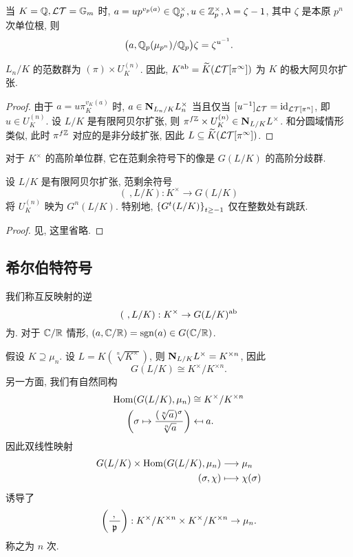 \begin{example}
当 $K={\mathbb{Q}},\mathcal{LT}=\mathbb{G}_m$ 时, $a=u p^{v_p(a)}\in {\mathbb{Q}}_p^\times,u\in{\mathbb{Z}}_p^\times,\lambda=\zeta-1$, 其中 $\zeta$ 是本原 $p^n$ 次单位根, 则
  \[\bigl(a,{\mathbb{Q}}_p(\mu_{p^n})/{\mathbb{Q}}_p\bigr)\zeta=\zeta^{u^{-1}}.\]
\end{example}

\begin{theorem}{}{}
$L_n/K$ 的范数群为 $(\pi)\times U_K^{(n)}$. 因此, $K^{\mathrm{ab}}=\widetilde K(\mathcal{LT}[\pi^\infty])$ 为 $K$ 的极大阿贝尔扩张.
\end{theorem}
\begin{proof}
由于 $a=u\pi_K^{v_K(a)}$ 时, $a\in {\mathbf{N}}_{L_n/K}L_n^\times$ 当且仅当 $[u^{-1}]_{\mathcal{LT}}={\mathrm{id}}_{\mathcal{LT}[\pi^n]}$, 即 $u\in U_K^{(n)}$. 设 $L/K$ 是有限阿贝尔扩张, 则 $\pi^{f{\mathbb{Z}}}\times U_K^{(n)}\in {\mathbf{N}}_{L/K}L^\times$. 和分圆域情形类似, 此时 $\pi^{f{\mathbb{Z}}}$ 对应的是非分歧扩张, 因此 $L\subseteq \widetilde K(\mathcal{LT}[\pi^\infty])$.
\end{proof}

对于 $K^\times$ 的高阶单位群, 它在范剩余符号下的像是 $G(L/K)$ 的高阶分歧群.
\begin{theorem}{}{}
设 $L/K$ 是有限阿贝尔扩张, 范剩余符号
  \[(\ , L/K):K^\times\to G(L/K)\]
将 $U^{(n)}_K$ 映为 $G^n(L/K)$. 特别地, $\left\{G^t(L/K)\right\}_{t\ge -1}$ 仅在整数处有跳跃.
\end{theorem}
\begin{proof}
见\cite[Chapter V, \S 6]{Neukirch1999}, 这里省略.
\end{proof}


\subsection{希尔伯特符号}
我们称互反映射的逆
  \[(~,L/K):K^\times\to G(L/K)^{\mathrm{ab}}\]
为. 对于 ${\mathbb{C}}/{\mathbb{R}}$ 情形, $(a,{\mathbb{C}}/{\mathbb{R}})={\mathrm{sgn}}(a)\in G({\mathbb{C}}/{\mathbb{R}})$.

假设 $K\supseteq \mu_n$. 设 $L=K(\sqrt[n]{K^\times})$, 则 ${\mathbf{N}}_{L/K}L^\times=K^{\times n}$, 因此
  \[G(L/K)\cong K^\times/K^{\times n}.\]
另一方面, 我们有自然同构
  \[\begin{split}
    {\mathrm{Hom}}(G(L/K),\mu_n)&\cong K^\times/K^{\times n}\\
    \left(\sigma\mapsto \frac{(\sqrt[n]{a})^\sigma}{\sqrt[n]{a}}\right)&\mapsfrom a.
  \end{split}\]
因此双线性映射
  \[\begin{split}G(L/K)\times {\mathrm{Hom}}(G(L/K),\mu_n) &\longrightarrow \mu_n \\ (\sigma,\chi) &\longmapsto \chi(\sigma)\end{split}\]
诱导了
  \[\left(\frac{{\ },{\ }}{{\mathfrak{p}}}\right): K^\times/K^{\times n}\times K^\times/K^{\times n} \to \mu_n.\]
称之为 $n$ 次.

